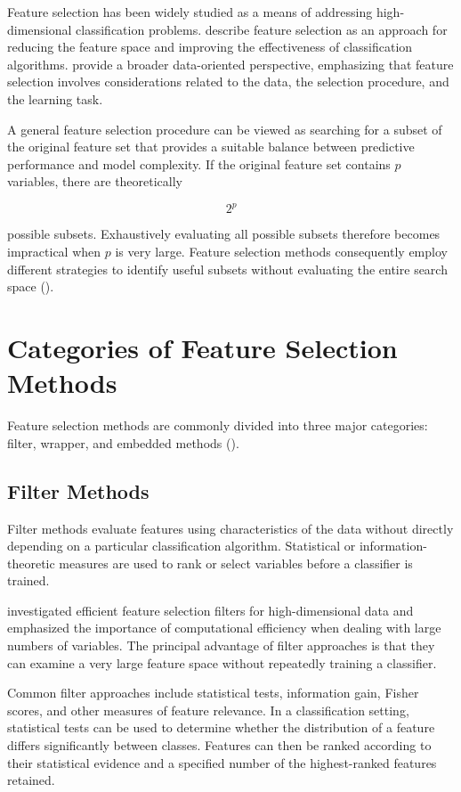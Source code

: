 Feature selection has been widely studied as a means of addressing high-dimensional classification problems. \citet{tang2013feature} describe feature selection as an approach for reducing the feature space and improving the effectiveness of classification algorithms. \citet{li2017feature} provide a broader data-oriented perspective, emphasizing that feature selection involves considerations related to the data, the selection procedure, and the learning task.

A general feature selection procedure can be viewed as searching for a subset of the original feature set that provides a suitable balance between predictive performance and model complexity. If the original feature set contains $p$ variables, there are theoretically

$$
2^p
$$

possible subsets. Exhaustively evaluating all possible subsets therefore becomes impractical when $p$ is very large. Feature selection methods consequently employ different strategies to identify useful subsets without evaluating the entire search space (\cite{tang2013feature}).

\section{Categories of Feature Selection Methods}

Feature selection methods are commonly divided into three major categories: filter, wrapper, and embedded methods (\cite{venkatesh2019review,tang2013feature,kumar2014feature}).

\subsection{Filter Methods}

Filter methods evaluate features using characteristics of the data without directly depending on a particular classification algorithm. Statistical or information-theoretic measures are used to rank or select variables before a classifier is trained.

\citet{ferreira_efficient_2012} investigated efficient feature selection filters for high-dimensional data and emphasized the importance of computational efficiency when dealing with large numbers of variables. The principal advantage of filter approaches is that they can examine a very large feature space without repeatedly training a classifier.

Common filter approaches include statistical tests, information gain, Fisher scores, and other measures of feature relevance. In a classification setting, statistical tests can be used to determine whether the distribution of a feature differs significantly between classes. Features can then be ranked according to their statistical evidence and a specified number of the highest-ranked features retained.


